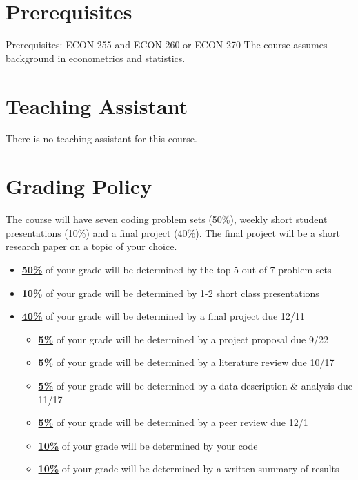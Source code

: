 \documentclass[11pt]{article}
\begin{document}
\section*{Prerequisites}
Prerequisites: ECON 255 and ECON 260 or ECON 270 The course assumes background in econometrics and statistics. 

\section*{Teaching Assistant}

There is no teaching assistant for this course. 

\section*{Grading Policy}
The course will have seven coding problem sets (50\%), weekly short student presentations (10\%) and a final project (40\%). The final project will be a short research paper on a topic of your choice. 

\begin{itemize}
	\item \underline{\textbf{50\%}} of your grade will be determined by the top 5 out of 7 problem sets
	\item \underline{\textbf{10\%}} of your grade will be determined by 1-2 short class presentations
	\item \underline{\textbf{40\%}} of your grade will be determined by a final project due 12/11
	\begin{itemize}
    \item \underline{\textbf{5\%}} of your grade will be determined by a project proposal due 9/22
    \item \underline{\textbf{5\%}} of your grade will be determined by a literature review due 10/17
    \item \underline{\textbf{5\%}} of your grade will be determined by a data description \& analysis due 11/17
    \item \underline{\textbf{5\%}} of your grade will be determined by a peer review due 12/1
    \item \underline{\textbf{10\%}} of your grade will be determined by your code
    \item \underline{\textbf{10\%}} of your grade will be determined by a written summary of results
  \end{itemize}
\end{itemize}

\end{document}
